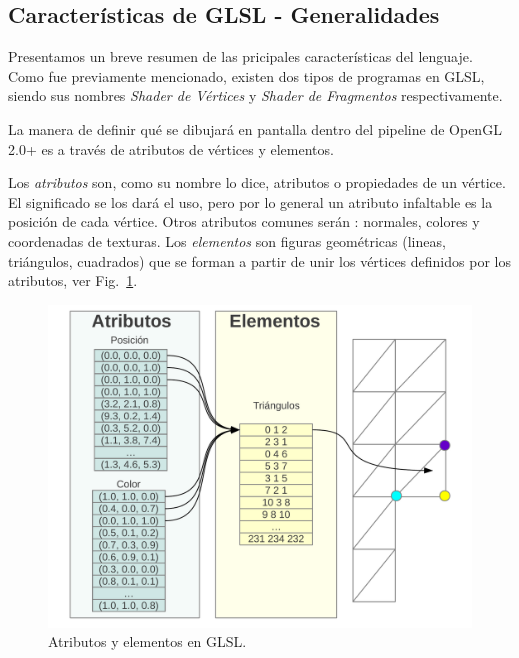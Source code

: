 
\subsection{Caracter\'isticas de GLSL - Generalidades}
Presentamos un breve resumen de las pricipales caracter\'isticas del lenguaje.
Como fue previamente mencionado, existen dos tipos de programas en GLSL, siendo sus nombres {\em Shader de Vértices} y {\em Shader de Fragmentos} respectivamente.

La manera de definir qué se dibujará en pantalla dentro del pipeline de OpenGL 2.0+  es a través de atributos de vértices y elementos. 


Los \emph{atributos} son, como su nombre lo dice, atributos o propiedades de un vértice. El significado se los dará el uso, pero por lo general un atributo infaltable es la posición de cada vértice. Otros atributos comunes serán : normales, colores y coordenadas de texturas.
Los \emph{elementos} son figuras geométricas (lineas, triángulos, cuadrados) que se forman a partir de unir los vértices definidos por los atributos, ver Fig.~\ref{fg:atributos}.

\begin{figure}[h]
\begin{center}
\includegraphics[width=13cm]{figures/atributos}
\caption{Atributos y elementos en GLSL.}
\end{center}
\label{fg:atributos}
\end{figure}

